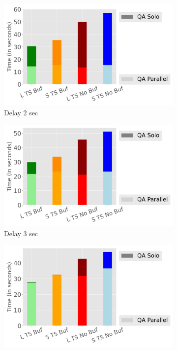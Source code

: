 \begin{figure}
	\centering
	\begin{subfigure}[c]{0.48\textwidth}
		\includegraphics[width=1\textwidth]   {figures/Experiments/Dynamic/Breakdown/dataset_104857600_lockfree_Messi_Results_query_answering_breakdown_10485760_2.png}
		\caption{Delay 2 sec}
		\label{fig:query-answering-breakdown-2}
	\end{subfigure}
	\begin{subfigure}[c]{0.48\textwidth}
		\includegraphics[width=1\textwidth]   {figures/Experiments/Dynamic/Breakdown/dataset_104857600_lockfree_Messi_Results_query_answering_breakdown_10485760_3.png}
		\caption{Delay 3 sec}
		\label{fig:query-answering-breakdown-3}
	\end{subfigure}
	\begin{subfigure}[c]{0.48\textwidth}
		\includegraphics[width=1\textwidth]   {figures/Experiments/Dynamic/Breakdown/dataset_104857600_lockfree_Messi_Results_query_answering_breakdown_10485760_5.png}

\end{subfigure}
\end{figure}
